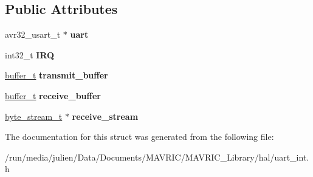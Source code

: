\subsection*{Public Attributes}
\begin{DoxyCompactItemize}
\item 
\hypertarget{structuart__interface__t_a6295e2fbf8c7904ce5e4b407b15c9323}{avr32\+\_\+usart\+\_\+t $\ast$ {\bfseries uart}}\label{structuart__interface__t_a6295e2fbf8c7904ce5e4b407b15c9323}

\item 
\hypertarget{structuart__interface__t_a7cffe285853261c95f94c35e930022f0}{int32\+\_\+t {\bfseries I\+R\+Q}}\label{structuart__interface__t_a7cffe285853261c95f94c35e930022f0}

\item 
\hypertarget{structuart__interface__t_aa5a5a30f4fff51cc1b79699f66e1c0ca}{\hyperlink{structbuffer__t}{buffer\+\_\+t} {\bfseries transmit\+\_\+buffer}}\label{structuart__interface__t_aa5a5a30f4fff51cc1b79699f66e1c0ca}

\item 
\hypertarget{structuart__interface__t_a31b9105da18f217628f549f19fc3eb90}{\hyperlink{structbuffer__t}{buffer\+\_\+t} {\bfseries receive\+\_\+buffer}}\label{structuart__interface__t_a31b9105da18f217628f549f19fc3eb90}

\item 
\hypertarget{structuart__interface__t_ab45dfb2613656d64d661de20d6258359}{\hyperlink{structbyte__stream__t}{byte\+\_\+stream\+\_\+t} $\ast$ {\bfseries receive\+\_\+stream}}\label{structuart__interface__t_ab45dfb2613656d64d661de20d6258359}

\end{DoxyCompactItemize}


The documentation for this struct was generated from the following file\+:\begin{DoxyCompactItemize}
\item 
/run/media/julien/\+Data/\+Documents/\+M\+A\+V\+R\+I\+C/\+M\+A\+V\+R\+I\+C\+\_\+\+Library/hal/uart\+\_\+int.\+h\end{DoxyCompactItemize}
